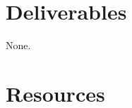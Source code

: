 \section{Deliverables}

None.

\section{Resources}

\renewcommand{\addcontentsline}[3]{}%



\begin{comment}

\section{Scalar quantization in the ($\text{DCT}_0,\text{DCT}_1,\text{DCT}_2$) domain}

The DCT is orthonormal, and thereore, the distortion can be measured
directly in the transform domain. This means that we can treat the DCT
coefficients as if would be pixels. Therefore, an optimal algorithm
for RDO~\cite{vruiz__information_theory} is:

\begin{enumerate}
\item Find the RD curve for each subband. We will use the same
  quantization steps for all the subbands. This action generates three
  curves.
\item Join all the RD points in a single list and sort it by the slope
  of the
  points~\cite{vruiz__information_theory}. Track\footnote{Storing with
  the point the combination subband index and quantization step used
  for each point.} the quantization steps used for each point.
\item Use the quantization patters described by the points of the
  sorted list to obtain the definitive RD curve. Notice that, since
  the DCT is orthonormal, we could estimate accurately the distortion
  in the definitive curve using directly the distortions of the
  subbands.
\end{enumerate}

Notice that the points that satisfy that
\begin{equation}
  \mathbf{\Delta}_0 = \mathbf{\Delta}_1 = \mathbf{\Delta}_2
  \label{eq:deltas}
\end{equation}
should belong to the definitive RD curve and should describe also the
convex hull of the curve. There is not guarantee that the rest of
points in which the Eq.~\eqref{eq:deltas} is not true will belong to
the convex hull (although they could be used to perform a finer
rate-control).


\end{comment}
